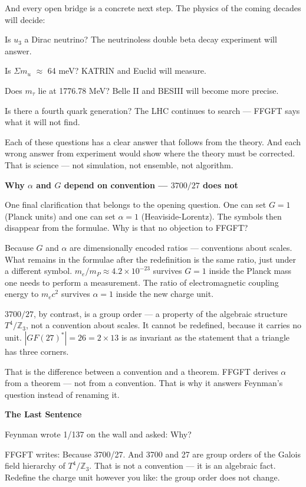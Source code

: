 \documentclass[11pt,oneside]{book}
\begin{document}
And every open bridge is a concrete next step. The physics of the coming
decades will decide:

Is $
u_3$ a Dirac neutrino? The neutrinoless double beta decay experiment
will answer.

Is $\Sigma m_
u$ $\approx$ 64 meV? KATRIN and Euclid will measure.

Does $m_\tau$ lie at 1776.78 MeV? Belle II and BESIII will become more
precise.

Is there a fourth quark generation? The LHC continues to search — FFGFT says
what it will not find.

Each of these questions has a clear answer that follows from the theory.
And each wrong answer from experiment would show where the theory must be
corrected. That is science — not simulation, not ensemble, not algorithm.

\textbf{Why $\alpha$ and $G$ depend on convention --- $3700/27$ does not}

One final clarification that belongs to the opening question. One can
set $G=1$ (Planck units) and one can set $\alpha=1$ (Heaviside-Lorentz).
The symbols then disappear from the formulae. Why is that no objection
to FFGFT?

Because $G$ and $\alpha$ are dimensionally encoded ratios ---
conventions about scales. What remains in the formulae after the
redefinition is the same ratio, just under a different symbol.
$m_e/m_P \approx 4.2\times10^{-23}$ survives $G=1$ inside the Planck
mass one needs to perform a measurement. The ratio of electromagnetic
coupling energy to $m_e c^2$ survives $\alpha=1$ inside the new charge
unit.

$3700/27$, by contrast, is a group order --- a property of the algebraic
structure $T^4/\mathbb{Z}_3$, not a convention about scales. It cannot
be redefined, because it carries no unit. $|GF(27)^*| = 26 = 2\times13$
is as invariant as the statement that a triangle has three corners.

That is the difference between a convention and a theorem.
FFGFT derives $\alpha$ from a theorem --- not from a convention.
That is why it answers Feynman's question instead of renaming it.


\textbf{The Last Sentence}

Feynman wrote 1/137 on the wall and asked: Why?

FFGFT writes: Because 3700/27. And 3700 and 27 are group orders of the
Galois field hierarchy of $T^4/\mathbb{Z}_3$. That is not a convention
--- it is an algebraic fact. Redefine the charge unit however you like:
the group order does not change.
\end{document}
